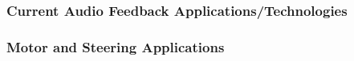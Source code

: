 \subsubsection{Current Audio Feedback Applications/Technologies}
\noindent


\subsubsection{Motor and Steering Applications} 

